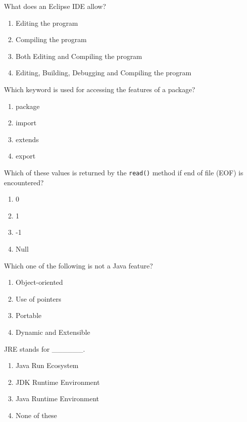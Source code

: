 \documentclass[11pt,a4paper]{article}
\begin{document}
\begin{parts}
  \item What does an Eclipse IDE allow?
  
\begin{enumerate}[label=(\alph*),itemsep=2pt]
    \item Editing the program
    \item Compiling the program
    \item Both Editing and Compiling the program
    \item Editing, Building, Debugging and Compiling the program
  \end{enumerate}
  
  \item Which keyword is used for accessing the features of a package?
  
\begin{enumerate}[label=(\alph*),itemsep=2pt]
    \item package
    \item import
    \item extends
    \item export
  \end{enumerate}
  
  \item Which of these values is returned by the   \texttt{read()} method if end of file (EOF) is encountered?
  
\begin{enumerate}[label=(\alph*),itemsep=2pt]
    \item 0
    \item 1
    \item -1
    \item Null
  \end{enumerate}
  
  \item Which one of the following is not a Java feature?
  
\begin{enumerate}[label=(\alph*),itemsep=2pt]
    \item Object-oriented
    \item Use of pointers
    \item Portable
    \item Dynamic and Extensible
  \end{enumerate}
  
  \item JRE stands for \_\_\_\_\_\_.
  
\begin{enumerate}[label=(\alph*),itemsep=2pt]
    \item Java Run Ecosystem
    \item JDK Runtime Environment
    \item Java Runtime Environment
    \item None of these
  \end{enumerate}
  

\end{parts}
\end{document}
